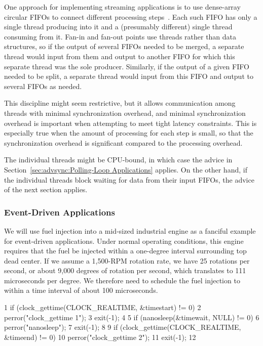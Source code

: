 One approach for implementing streaming applications is to use
dense-array circular FIFOs to connect different processing
steps~\cite{AdrianSutton2013LCA:Disruptor}.
Each such FIFO has only a single thread producing into it and a
(presumably different) single thread consuming from it.
Fan-in and fan-out points use threads rather than data structures,
so if the output of several FIFOs needed to be merged, a separate
thread would input from them and output to another FIFO for which
this separate thread was the sole producer.
Similarly, if the output of a given FIFO needed to be split, a separate
thread would input from this FIFO and output to several FIFOs as needed.

This discipline might seem restrictive, but it allows communication
among threads with minimal synchronization overhead, and minimal
synchronization overhead is important when attempting to meet
tight latency constraints.
This is especially true when the amount of processing for each step
is small, so that the synchronization overhead is significant compared
to the processing overhead.

The individual threads might be CPU-bound, in which case the advice in
Section~\ref{sec:advsync:Polling-Loop Applications} applies.
On the other hand, if the individual threads block waiting for
data from their input FIFOs, the advice of the next section applies.

\subsubsection{Event-Driven Applications}
\label{sec:advsync:Event-Driven Applications}

We will use fuel injection into a mid-sized industrial engine as a
fanciful example for event-driven applications.
Under normal operating conditions, this engine requires that the fuel
be injected within a one-degree interval surrounding top dead center.
If we assume a 1,500-RPM rotation rate, we have 25 rotations per second,
or about 9,000 degrees of rotation per second, which translates to
111 microseconds per degree.
We therefore need to schedule the fuel injection to within a time
interval of about 100 microseconds.

\begin{listing}[tb]
{ \scriptsize
\begin{verbbox}
 1 if (clock_gettime(CLOCK_REALTIME, &timestart) != 0) {
 2   perror("clock_gettime 1");
 3   exit(-1);
 4 }
 5 if (nanosleep(&timewait, NULL) != 0) {
 6   perror("nanosleep");
 7   exit(-1);
 8 }
 9 if (clock_gettime(CLOCK_REALTIME, &timeend) != 0) {
10   perror("clock_gettime 2");
11   exit(-1);
12 }
\end{verbbox}
}
\centering
\theverbbox
\caption{Timed-Wait Test Program}
\label{lst:advsync:Timed-Wait Test Program}
\end{listing}

